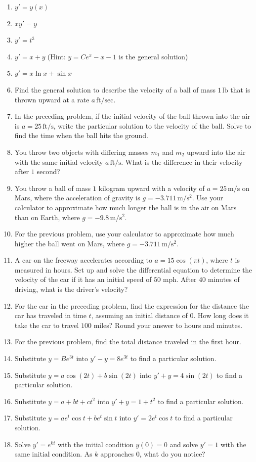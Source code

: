 \documentclass{exercises}
\begin{document}
\begin{enumerate}[resume]
\item \techrequired $y'=y(x)$
\item \techrequired $xy'=y$
\item \techrequired $y'=t^{3}$
\item \techrequired $y'=x+y$ (Hint: $y=Ce^{x}-x-1$ is the general solution)
\item \techrequired $y'=x\ln x+\sin x$
\item Find the general solution to describe the velocity of a ball of mass $1\,\text{lb}$ that is thrown upward at a rate $a\,\text{ft}/\text{sec}$.
\item In the preceding problem, if the initial velocity of the ball thrown into the air is $a=25\,\text{ft}/\text{s}$, write the particular solution to the velocity of the ball. Solve to find the time when the ball hits the ground.
\item You throw two objects with differing masses $m_{1}$ and $m_{2}$ upward into the air with the same initial velocity $a\,\text{ft}/\text{s}$. What is the difference in their velocity after $1$ second?
\item \techrequired You throw a ball of mass $1$ kilogram upward with a velocity of $a=25\,\text{m}/\text{s}$ on Mars, where the acceleration of gravity is $g=-3.711\,\text{m}/\text{s}^{2}$. Use your calculator to approximate how much longer the ball is in the air on Mars than on Earth, where $g=-9.8\,\text{m}/\text{s}^{2}$.
\item \techrequired For the previous problem, use your calculator to approximate how much higher the ball went on Mars, where $g=-3.711\,\text{m}/\text{s}^{2}$.
\item \techrequired A car on the freeway accelerates according to $a=15\cos(\pi t)$, where $t$ is measured in hours. Set up and solve the differential equation to determine the velocity of the car if it has an initial speed of $50$ mph. After $40$ minutes of driving, what is the driver's velocity?
\item \techrequired For the car in the preceding problem, find the expression for the distance the car has traveled in time $t$, assuming an initial distance of $0$. How long does it take the car to travel $100$ miles? Round your answer to hours and minutes.
\item \techrequired For the previous problem, find the total distance traveled in the first hour.
\item Substitute $y=Be^{3t}$ into $y'-y=8e^{3t}$ to find a particular solution.
\item Substitute $y=a\cos(2t)+b\sin(2t)$ into $y'+y=4\sin(2t)$ to find a particular solution.
\item Substitute $y=a+bt+ct^{2}$ into $y'+y=1+t^{2}$ to find a particular solution.
\item Substitute $y=ae^{t}\cos t+be^{t}\sin t$ into $y'=2e^{t}\cos t$ to find a particular solution.
\item Solve $y'=e^{kt}$ with the initial condition $y(0)=0$ and solve $y'=1$ with the same initial condition. As $k$ approaches $0$, what do you notice?
\end{enumerate}
\end{document}
